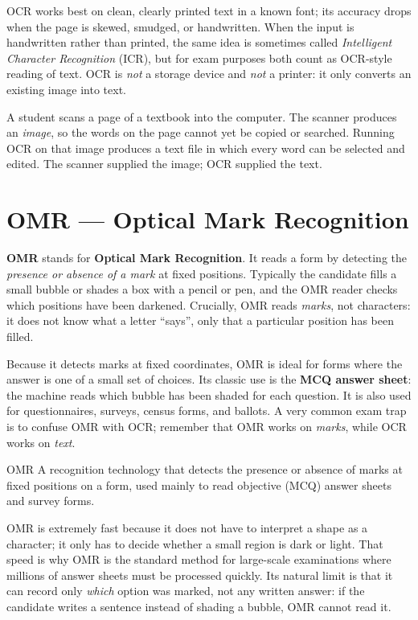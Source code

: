 OCR works best on clean, clearly printed text in a known font; its accuracy
drops when the page is skewed, smudged, or handwritten. When the input is
handwritten rather than printed, the same idea is sometimes called
\emph{Intelligent Character Recognition} (ICR), but for exam purposes both
count as OCR-style reading of text. OCR is \emph{not} a storage device and
\emph{not} a printer: it only converts an existing image into text.

\begin{example}
A student scans a page of a textbook into the computer. The scanner produces
an \emph{image}, so the words on the page cannot yet be copied or searched.
Running OCR on that image produces a text file in which every word can be
selected and edited. The scanner supplied the image; OCR supplied the text.
\end{example}

\section{OMR --- Optical Mark Recognition}
\textbf{OMR} stands for \textbf{Optical Mark Recognition}. It reads a form
by detecting the \emph{presence or absence of a mark} at fixed positions.
Typically the candidate fills a small bubble or shades a box with a pencil or
pen, and the OMR reader checks which positions have been darkened. Crucially,
OMR reads \emph{marks}, not characters: it does not know what a letter
``says'', only that a particular position has been filled.

Because it detects marks at fixed coordinates, OMR is ideal for forms where
the answer is one of a small set of choices. Its classic use is the
\textbf{MCQ answer sheet}: the machine reads which bubble has been shaded for
each question. It is also used for questionnaires, surveys, census forms, and
ballots. A very common exam trap is to confuse OMR with OCR; remember that
OMR works on \emph{marks}, while OCR works on \emph{text}.

\begin{definitionbox}{OMR}
A recognition technology that detects the presence or absence of marks at
fixed positions on a form, used mainly to read objective (MCQ) answer
sheets and survey forms.
\end{definitionbox}

OMR is extremely fast because it does not have to interpret a shape as a
character; it only has to decide whether a small region is dark or light.
That speed is why OMR is the standard method for large-scale examinations
where millions of answer sheets must be processed quickly. Its natural limit
is that it can record only \emph{which} option was marked, not any written
answer: if the candidate writes a sentence instead of shading a bubble, OMR
cannot read it.

